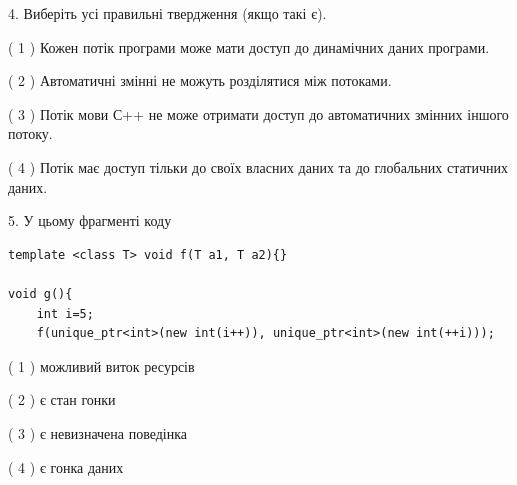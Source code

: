 \documentclass[12pt, ukrainian]{article}
\begin{document}
\begin {large}
{%
4. Виберіть усі правильні твердження (якщо такі є).\par
\vspace{2mm}

( 1 ) Кожен потік програми може мати доступ до динамічних даних програми.%

( 2 ) Автоматичні змінні не можуть розділятися між потоками.%

( 3 ) Потік мови С++ не може отримати доступ до автоматичних змінних іншого потоку.%

( 4 ) Потік має доступ тільки до своїх власних даних та до глобальних статичних даних.%


5. У цьому фрагменті коду
\begin{verbatim}
template <class T> void f(T a1, T a2){}

void g(){
    int i=5;
    f(unique_ptr<int>(new int(i++)), unique_ptr<int>(new int(++i)));
\end{verbatim}

( 1 ) можливий виток ресурсів%

( 2 ) є стан гонки%

( 3 ) є невизначена поведінка%

( 4 ) є гонка даних%
}
\end {large}
\end{document}
